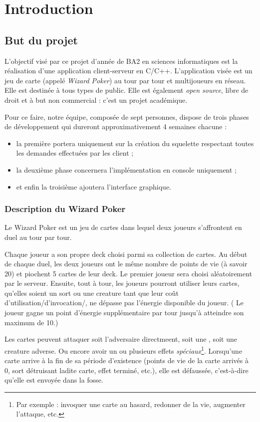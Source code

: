 \documentclass{article}
\begin{document}
\tableofcontents
\newpage
{}

\section{Introduction}
	\subsection{But du projet}
		L'objectif visé par ce projet d'année de BA2 en sciences informatiques est la réalisation d'une application client-serveur en C/C++. L'application visée est
		un jeu de carte (appelé \textit{Wizard Poker}) au tour par tour et multijoueurs en réseau. Elle est destinée à tous types de public. Elle est également
		\textit{open source}, libre de droit et à but non commercial : c'est un projet académique.

		Pour ce faire, notre équipe, composée de sept personnes, dispose de trois phases de développement qui dureront approximativement 4 semaines chacune :
		\begin{itemize}
			\item la première portera uniquement sur la création du squelette respectant toutes les demandes effectuées par les client ;
			\item la deuxième phase concernera l'implémentation en console uniquement ;
			\item et enfin la troisième ajoutera l'interface graphique.
		\end{itemize}

		\subsubsection{Description du Wizard Poker}
			Le Wizard Poker est un jeu de cartes dans lequel deux joueurs s'affrontent en duel au tour par tour.
			
			Chaque joueur a son propre deck choisi parmi sa collection de cartes. Au début de chaque duel, les deux joueurs ont le même nombre de points de vie (à savoir 20) et piochent 5 cartes de leur deck.
			Le premier joueur sera choisi aléatoirement par le serveur. Ensuite, tout à tour, les joueurs pourront utiliser leurs cartes, qu'elles soient un sort ou une creature tant que leur coût d'utilisation/d'invocation/, ne dépasse pas l'énergie disponible du joueur. ( Le joueur gagne un point d'énergie supplémentaire par tour jusqu'à atteindre son maximum de 10.)
			
			Les cartes peuvent attaquer soit l'adversaire directmeent, soit une , soit une creature adverse. Ou encore avoir un ou plusieurs effets \textit{spéciaux}\footnote{Par exemple : invoquer une carte au hasard, redonner de la vie, augmenter l'attaque, etc.}. 
			Lorsqu'une carte arrive à la fin de sa période d'existence (points de vie de la carte arrivés à 0, sort détruisant ladite carte, effet terminé, etc.), elle est défaussée, c'est-à-dire qu'elle est envoyée dans la fosse.
			
\end{document}
